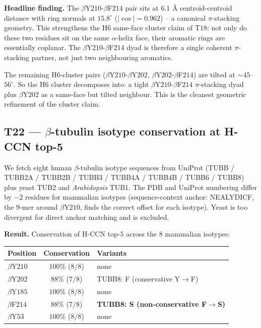 \documentclass[11pt,a4paper]{article}
\begin{document}
\textbf{Headline finding.} The $\beta$Y$210$-$\beta$F$214$ pair sits
at $6.1$ \AA{} centroid-centroid distance with ring normals at $15.8^\circ$
($|\cos| = 0.962$) -- a canonical $\pi$-stacking geometry. This
strengthens the H$6$ same-face cluster claim of T$18$: not only do
these two residues sit on the same $\alpha$-helix face, their aromatic
rings are essentially coplanar. The $\beta$Y$210$-$\beta$F$214$ dyad
is therefore a single coherent $\pi$-stacking partner, not just two
neighbouring aromatics.

The remaining H$6$-cluster pairs ($\beta$Y$210$-$\beta$Y$202$,
$\beta$Y$202$-$\beta$F$214$) are tilted at $\sim 45$--$56^\circ$. So
the H$6$ cluster decomposes into: a tight $\beta$Y$210$-$\beta$F$214$
$\pi$-stacking dyad plus $\beta$Y$202$ as a same-face but tilted
neighbour. This is the cleanest geometric refinement of the cluster
claim.

\subsection{\textsf{T22} --- $\beta$-tubulin isotype conservation at H-CCN top-5}\label{ssec:t22}

We fetch eight human $\beta$-tubulin isotype sequences from UniProt
(TUBB / TUBB2A / TUBB2B / TUBB3 / TUBB4A / TUBB4B / TUBB6 / TUBB8)
plus yeast TUB2 and \emph{Arabidopsis} TUB1. The PDB and UniProt
numbering differ by $-2$ residues for mammalian isotypes (sequence-context
anchor: NEALYDICF, the $9$-mer around $\beta$Y$210$, finds the
correct offset for each isotype). Yeast is too divergent for direct
anchor matching and is excluded.

\textbf{Result.} Conservation of H-CCN top-$5$ across the $8$ mammalian
isotypes:

\begin{center}
\begin{tabular}{lcl}\toprule
Position & Conservation & Variants \\\midrule
$\beta$Y$210$ & $100\%$ ($8/8$) & none \\
$\beta$Y$202$ & $88\%$ ($7/8$) & TUBB8: F (conservative Y$\to$F) \\
$\beta$Y$185$ & $100\%$ ($8/8$) & none \\
$\beta$F$214$ & $88\%$ ($7/8$) & \textbf{TUBB8: S (non-conservative F$\to$S)} \\
$\beta$Y$53$  & $100\%$ ($8/8$) & none \\
\bottomrule\end{tabular}
\end{center}
\end{document}

